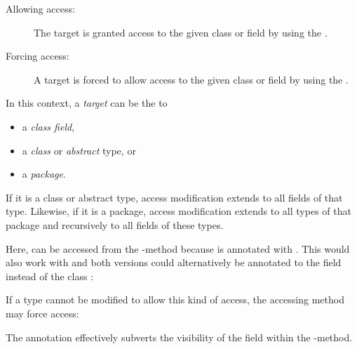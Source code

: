 \begin{description}
	\item[Allowing access:] The target is granted access to the given class or field by using the  .
	\item[Forcing access:] A target is forced to allow access to the given class or field by using the  .
\end{description}

In this context, a \emph{target} can be the  to

\begin{itemize}
	\item a \emph{class field},
	\item a \emph{class} or \emph{abstract} type, or
	\item a \emph{package}.
\end{itemize}

If it is a class or abstract type, access modification extends to all fields of that type. Likewise, if it is a package, access modification extends to all types of that package and recursively to all fields of these types.


Here,  can be accessed from the -method because  is annotated with . This would also work with  and both versions could alternatively be annotated to the field  instead of the class :


If a type cannot be modified to allow this kind of access, the accessing method may force access:


The  annotation effectively subverts the visibility of the  field within the -method. 

